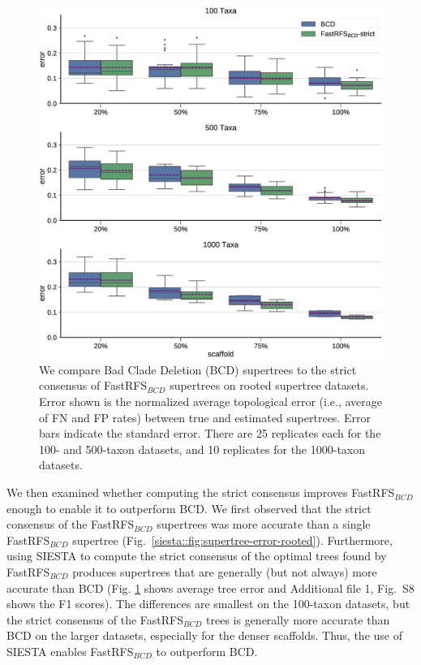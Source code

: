 \begin{figure}[ht]
  \centering
 \includegraphics[width=1\textwidth]{siesta-figs/best-supertree-comparison-mult_only}
\caption[Error rates for BCD and FastRFS$_{BCD}$+SIESTA (strict consensus) on simulated datasets]{We compare Bad Clade Deletion (BCD) supertrees to the strict consensus of FastRFS$_{BCD}$ supertrees on rooted supertree datasets.
Error shown is the normalized average topological error (i.e., average of FN and FP rates) between true and estimated supertrees.
Error bars indicate the standard error. 
There are 25 replicates each for the 100- and 500-taxon datasets, and 10 replicates for the 1000-taxon datasets.
  }\label{siesta::fig:supertree-bcd-error}
\end{figure}


We then examined whether computing the strict consensus improves FastRFS$_{BCD}$ enough to enable it to outperform BCD.
We first observed that
 the strict consensus of the FastRFS$_{BCD}$ supertrees was more accurate than a single FastRFS$_{BCD}$ supertree (Fig.~\ref{siesta::fig:supertree-error-rooted}).
Furthermore, using SIESTA to compute the strict consensus of the optimal trees found by   FastRFS$_{BCD}$ produces supertrees that are generally (but not always) more accurate than BCD 
(Fig. \ref{siesta::fig:supertree-bcd-error} shows average tree error  and  Additional file 1, Fig.~S8 shows the F1 scores).
The differences are smallest on the 100-taxon datasets, but the strict consensus of the FastRFS$_{BCD}$ trees is generally more
accurate than BCD on the larger datasets, especially for the denser scaffolds.  
Thus,  the use of SIESTA enables FastRFS$_{BCD}$ to outperform BCD.

















